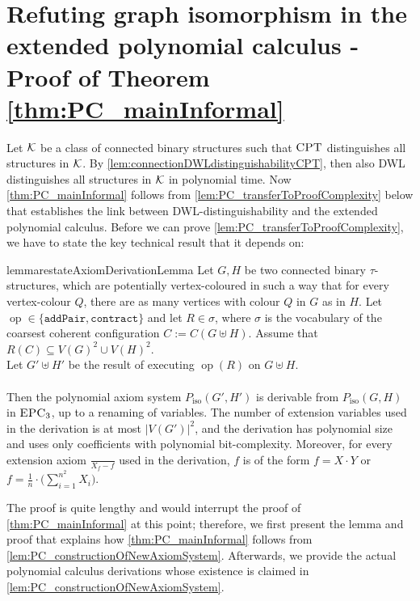 \documentclass[a4paper,UKenglish,cleveref, autoref, thm-restate]{lipics-v2021}
\newcommand{\CPT}{\mbox{\sc CPT}}
\newcommand{\EPC}{\mbox{\sc EPC}}
\newcommand{\Kk}{{\cal K}}
\newcommand{\pairOp }{\texttt{addPair}}
\newcommand{\sccOp }{\texttt{contract}}
\newcommand{\op}{\operatorname{op}}
\newcommand{\Piso}{P_{\text{iso}}}
\begin{document}
	\section{Refuting graph isomorphism in  the extended polynomial calculus - Proof of Theorem \ref{thm:PC_mainInformal}}	
	
	\label{sec:PC_mainProof}	
	Let $\Kk$ be a class of connected binary structures such that $\CPT$ distinguishes all structures in $\Kk$.
	By \autoref{lem:connectionDWLdistinguishabilityCPT}, then also DWL distinguishes all structures in $\Kk$ in polynomial time. 
	Now \autoref{thm:PC_mainInformal} follows from \autoref{lem:PC_transferToProofComplexity} below that establishes the link between DWL-distinguishability and the extended polynomial calculus. 
	Before we can prove \autoref{lem:PC_transferToProofComplexity}, we have to state the key technical result that it depends on: 
	\begin{restatable}{lemma}{restateAxiomDerivationLemma}
		\label{lem:PC_constructionOfNewAxiomSystem}
		Let $G,H$ be two connected binary $\tau$-structures, which are potentially vertex-coloured in such a way that for every vertex-colour $Q$, there are as many vertices with colour $Q$ in $G$ as in $H$.
		Let $\op \in \{ \pairOp , \sccOp \}$ and let $R \in \sigma$, where $\sigma$ is the vocabulary of the coarsest coherent configuration $C:= C(G \uplus H)$. Assume that $R(C) \subseteq V(G)^2 \cup V(H)^2$.\\
		Let $G' \uplus H'$ be the result of executing $\op(R)$ on $G \uplus H$.\\
		\\
		Then the polynomial axiom system $\Piso(G',H')$ is derivable from $\Piso(G,H)$ in $\EPC_3$, up to a renaming of variables. The number of extension variables used in the derivation is at most $|V(G')|^2$, and the derivation has polynomial size and uses only coefficients with polynomial bit-complexity. Moreover, for every extension axiom $\frac{}{X_f -f}$ used in the derivation, $f$ is of the form $f = X \cdot Y$ or $f = \frac{1}{n} \cdot \Big(\sum_{i=1}^{n^2} X_i\Big)$.
	\end{restatable}
	
	The proof is quite lengthy and would interrupt the proof of \autoref{thm:PC_mainInformal} at this point; therefore, we first present the lemma and proof that explains how \autoref{thm:PC_mainInformal} follows from \autoref{lem:PC_constructionOfNewAxiomSystem}. Afterwards, we provide the actual polynomial calculus derivations whose existence is claimed in \autoref{lem:PC_constructionOfNewAxiomSystem}. 
	
\end{document}

